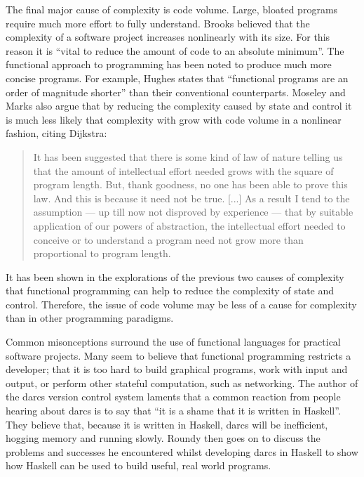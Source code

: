 The final major cause of complexity is code volume. Large, bloated programs
require much more effort to fully understand. Brooks believed that the complexity
of a software project increases nonlinearly with its size.\cite{brooks1987bullet}
For this reason it is ``vital to reduce the amount of code to an absolute
minimum''.\cite{moseley2006tarpit} The functional approach to programming
has been noted to produce much more concise programs. For example, Hughes
states that ``functional programs are an order of magnitude shorter'' than
their conventional counterparts.\cite{hughes1989whyfp} Moseley and Marks
also argue that by reducing the complexity caused by state and control it
is much less likely that complexity with grow with code volume in a nonlinear
fashion, citing Dijkstra\cite{dijkstra1972humble}:

\begin{quote}
It has been suggested that there is some kind of law of nature telling us that
the amount of intellectual effort needed grows with the square of program length.
But, thank goodness, no one has been able to prove this law. And this is because
it need not be true. [...] As a result I tend to the assumption --- up till now
not disproved by experience --- that by suitable application of our powers of
abstraction, the intellectual effort needed to conceive or to understand a program
need not grow more than proportional to program length.
\end{quote}
\noindent
It has been shown in the explorations of the previous two causes of complexity
that functional programming can help to reduce the complexity of state and
control. Therefore, the issue of code volume may be less of a cause for complexity
than in other programming paradigms.

Common misonceptions surround the use of functional languages for practical
software projects. Many seem to believe that functional programming restricts
a developer; that it is too hard to build graphical programs, work with input
and output, or perform other stateful computation, such as networking.
The author of the darcs version control system laments that a common reaction
from people hearing about darcs is to say that ``it is a shame that it is
written in Haskell''.\cite{roundy2005darcs} They believe that, because it is
written in Haskell, darcs will be inefficient, hogging memory and running slowly.
Roundy then goes on to discuss the problems and successes he encountered whilst
developing darcs in Haskell to show how Haskell can be used to build useful, real
world programs.

